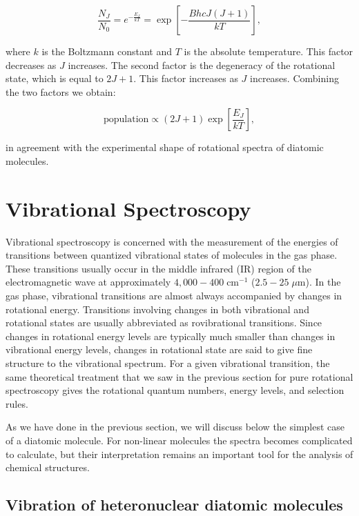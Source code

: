 \documentclass[
  9pt,
]{extbook}
\theoremstyle{definition}
\theoremstyle{definition}
\theoremstyle{definition}
\theoremstyle{remark}
\begin{document}
\begin{equation}
\frac{N_J}{N_0}=e^{-\frac{E_J}{kT}} =\exp\left[-\frac {BhcJ(J+1)}{kT}\right],
\label{eq:rot6}
\end{equation}

where \(k\) is the Boltzmann constant and \(T\) is the absolute temperature. This factor decreases as \(J\) increases. The second factor is the degeneracy of the rotational state, which is equal to \(2J+1\). This factor increases as \(J\) increases. Combining the two factors we obtain:

\begin{equation}
\mathrm{population} \propto (2J+1)\exp\left[\frac{E_J}{kT}\right],
\label{eq:rot7}
\end{equation}

in agreement with the experimental shape of rotational spectra of diatomic molecules.

\hypertarget{vibrational-spectroscopy}{%
\section{Vibrational Spectroscopy}\label{vibrational-spectroscopy}}

Vibrational spectroscopy is concerned with the measurement of the energies of transitions between quantized vibrational states of molecules in the gas phase. These transitions usually occur in the middle infrared (IR) region of the electromagnetic wave at approximately \(4,000-400\;\text{cm}^{-1}\) (\(2.5-25\;\mu \text{m}\)). In the gas phase, vibrational transitions are almost always accompanied by changes in rotational energy. Transitions involving changes in both vibrational and rotational states are usually abbreviated as rovibrational transitions. Since changes in rotational energy levels are typically much smaller than changes in vibrational energy levels, changes in rotational state are said to give fine structure to the vibrational spectrum. For a given vibrational transition, the same theoretical treatment that we saw in the previous section for pure rotational spectroscopy gives the rotational quantum numbers, energy levels, and selection rules.

As we have done in the previous section, we will discuss below the simplest case of a diatomic molecule. For non-linear molecules the spectra becomes complicated to calculate, but their interpretation remains an important tool for the analysis of chemical structures.

\hypertarget{vibration-of-heteronuclear-diatomic-molecules}{%
\subsection{Vibration of heteronuclear diatomic molecules}\label{vibration-of-heteronuclear-diatomic-molecules}}
\end{document}
